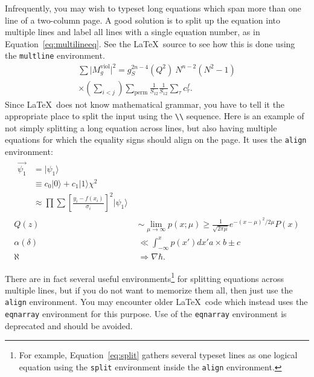 Infrequently, you may wish to typeset long equations which span more
than one line of a two-column page.  A good solution is to split up
the equation into multiple lines and label all lines with a single
equation number, as in Equation~\eqref{eq:multilineeq}.  See the
\LaTeX\ source to see how this is done using the \texttt{multline} environment.
%
\begin{multline}
  \sum \vert M^{\text{viol}}_g \vert ^2
   =  g^{2n-4}_S(Q^2)~N^{n-2} (N^2-1) \\
     \times \left( \sum_{i<j}\right) \sum_{\text{perm}}
            \frac{1}{S_{12}}  \frac{1}{S_{12}} \sum_\tau c^f_\tau  \label{eq:multilineeq}.
\end{multline}
%
Since \LaTeX\ does not know mathematical grammar, you have to tell it the appropriate place to split the input using the \verb+\\+ sequence. Here is an example of not simply splitting a long equation across lines, but also having multiple equations for which the equality signs should align on the page. It uses the \texttt{align} environment:
\begin{align}
\begin{split}
\vec{\psi_1} &= |\psi_1\rangle\\ 
         &\equiv c_0|0\rangle + c_1|1\rangle \chi^2\\
        &\approx \prod\sum\left[\frac{y_i-f(x_i)}{\sigma_i}\right]^2 
                    |\psi_1\rangle 
\end{split} \label{eq:split}\\
         Q(z)  &\sim \lim_{\mu \rightarrow \infty}p(x;\mu) \geq 
                   \frac{1}{\sqrt{2 \pi \mu}} e^{-(x-\mu)^2 / 2\mu}P(x) \\
         \alpha(\delta)   &\ll \int_{-\infty}^x p(x')dx'a \times b \pm c \\
\aleph    &\Rightarrow \nabla \hbar \label{eq:aligneq}.
\end{align}

There are in fact several useful environments\footnote{For example, 
Equation~\eqref{eq:split} gathers several typeset lines as one logical 
equation using the \texttt{split} environment inside the \texttt{align} 
environment.} for splitting equations across multiple lines, but if you 
do not want to memorize them all, then just use the \texttt{align} 
environment. You may encounter older \LaTeX\ code which instead uses the
 \texttt{eqnarray} environment for this purpose. Use of the \texttt{eqnarray}
 environment is deprecated and should be avoided.


